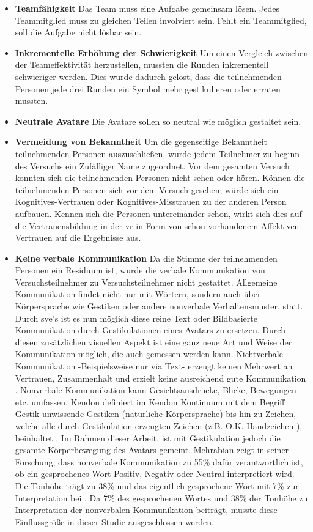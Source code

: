 \documentclass[a4paper,11pt]{article}%
\renewcommand{\\}{\vspace*{0.5\baselineskip} \newline}
\begin{document}
\begin{itemize}
\item \textbf{Teamfähigkeit} Das Team muss eine Aufgabe gemeinsam lösen. Jedes Teammitglied muss zu gleichen Teilen involviert sein. Fehlt ein Teammitglied, soll die Aufgabe nicht lösbar sein.
\item \textbf{Inkrementelle Erhöhung der Schwierigkeit} Um einen Vergleich zwischen der Teameffektivität herzustellen, mussten die Runden inkrementell schwieriger werden. Dies wurde dadurch gelöst, dass die teilnehmenden Personen jede drei Runden ein Symbol mehr gestikulieren  oder erraten mussten.
\item \textbf{Neutrale Avatare} Die Avatare sollen so neutral wie möglich gestaltet sein. 
\item \textbf{Vermeidung von Bekanntheit} Um die gegenseitige Bekanntheit  teilnehmenden Personen auszuschließen, wurde jedem Teilnehmer zu beginn des Versuchs ein Zufälliger Name zugeordnet. Vor dem gesamten Versuch konnten sich die teilnehmenden Personen nicht sehen oder hören.
Können die teilnehmenden Personen sich vor dem Versuch gesehen, würde sich ein Kognitives-Vertrauen oder Kognitives-Misstrauen zu der anderen Person aufbauen. 
Kennen sich die Personen untereinander schon, wirkt sich dies auf die Vertrauensbildung in der \ac{vr} in Form von schon vorhandenem Affektiven-Vertrauen auf die Ergebnisse aus.
\item \textbf{Keine verbale Kommunikation} Da die Stimme der teilnehmenden Personen ein Residuum ist, wurde die verbale Kommunikation von Versuchsteilnehmer zu Versuchsteilnehmer nicht gestattet. Allgemeine Kommunikation findet nicht nur mit Wörtern, sondern auch über Körpersprache wie Gestiken oder andere nonverbale Verhaltensmuster, statt. Durch \ac{sve}'s ist es nun möglich diese reine Text oder Bildbasierte Kommunikation durch Gestikulationen eines Avatars zu ersetzen. Durch diesen zusätzlichen visuellen Aspekt ist eine ganz neue Art und Weise der Kommunikation möglich, die auch gemessen werden kann. 
Nichtverbale Kommunikation -Beispielsweise nur via Text- erzeugt keinen Mehrwert an Vertrauen, Zusammenhalt und erzielt keine ausreichend gute Kommunikation \citep[p.81]{haslam2003social}.
Nonverbale Kommunikation kann Gesichtsausdrücke, Blicke, Bewegungen etc. umfassen. Kendon definiert im \dq{}Kendon Kontinuum\dq{} mit dem Begriff \dq{}Gestik\dq{} unwissende Gestiken (natürliche Körpersprache) bis hin zu \dq{} Zeichen\flqq, welche alle durch Gestikulation erzeugten Zeichen (z.B. O.K. Handzeichen ), beinhaltet \citep[37]{mcneill1992hand}.
Im Rahmen dieser Arbeit, ist mit Gestikulation jedoch die gesamte Körperbewegung des Avatars gemeint.
Mehrabian zeigt in seiner Forschung, dass nonverbale Kommunikation zu 55\% dafür verantwortlich ist, ob ein gesprochenes Wort Positiv, Negativ oder Neutral interpretiert wird. Die Tonhöhe trägt zu 38\% und das eigentlich gesprochene Wort mit 7\% zur Interpretation bei \citep[43]{mehrabian1971silent}.
Da 7\% des gesprochenen Wortes und 38\% der Tonhöhe zu Interpretation der nonverbalen Kommunikation beiträgt, musste diese Einflussgröße in dieser Studie ausgeschlossen werden.
\end{itemize}
\end{document}
